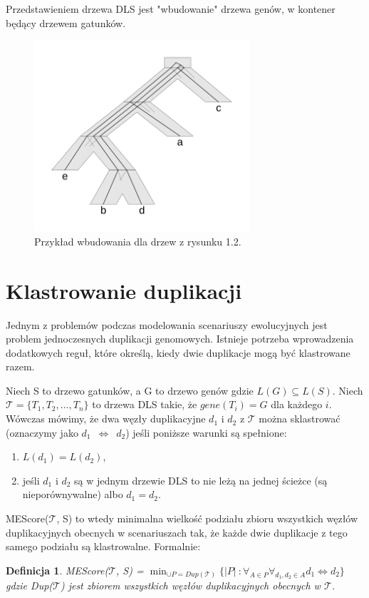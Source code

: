 \documentclass[licencjacka]{pracamgr}
\newtheorem{defi}{Definicja}[section]
\begin{document}
Przedstawieniem drzewa DLS jest "wbudowanie" drzewa genów, w kontener będący drzewem gatunków. 


\begin{figure}[H]
  \centering
  \includegraphics[width=80mm]{./pictures/optscen.png}
  \caption{Przykład wbudowania dla drzew z rysunku 1.2.}
\end{figure}

\section{Klastrowanie duplikacji}

Jednym z problemów podczas modelowania scenariuszy ewolucyjnych jest problem jednoczesnych duplikacji genomowych. Istnieje potrzeba wprowadzenia dodatkowych reguł, które określą, kiedy dwie duplikacje mogą być klastrowane razem. 
 
Niech S to drzewo gatunków, a G to drzewo genów gdzie $L(G) \subseteq L(S)$. Niech $\mathcal{T}=\{T_1,T_2, \dots , T_n\}$ to drzewa DLS takie, że $gene(T_i)=G$ dla każdego $i$. Wówczas mówimy, że dwa węzły duplikacyjne $d_1$ i $d_2$ z $\mathcal{T}$ można sklastrować (oznaczymy jako $d_1$~$\Longleftrightarrow$~$d_2$)  jeśli poniższe warunki są spełnione:
\begin{enumerate}
\item $L(d_1) = L({d_2})$,
\item jeśli $d_1$ i $d_2$ są w jednym drzewie DLS to nie leżą na jednej ścieżce (są nieporównywalne) albo $d_1=d_2$.
\end{enumerate}

MEScore($\mathcal{T}$, S) to wtedy minimalna wielkość podziału zbioru wszystkich węzłów duplikacyjnych obecnych w scenariuszach tak, że każde dwie duplikacje z tego samego podziału są klastrowalne. Formalnie:

\begin{defi}\label{ME}
  MEScore($\mathcal{T}$, S) = $\min_{\cup P = Dup(\mathcal{T})} \lbrace \vert P \vert\ : \forall_{A \in P} \forall_{d_1,d_2 \in A} d_1 \Longleftrightarrow d_2 \rbrace$
 gdzie Dup($\mathcal{T}$) jest zbiorem wszystkich węzłów duplikacyjnych obecnych w $\mathcal{T}$. 
\end{defi}
\end{document}
